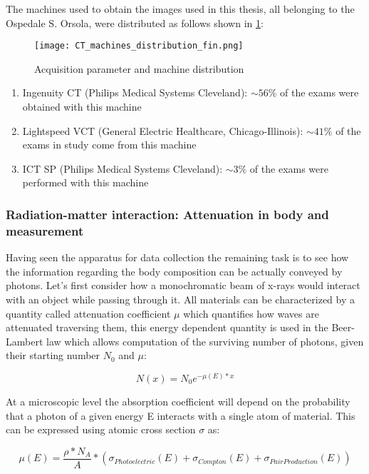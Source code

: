 The machines used to obtain the images used in this thesis, all belonging to the Ospedale S. Orsola, were distributed as follows shown in \ref{fig:ct_dist}:


\begin{figure}[H]
\centering
  		\texttt{[image: CT\_machines\_distribution\_fin.png]}
        \caption{Acquisition parameter and machine distribution\label{fig:ct_dist}}
\end{figure}

\begin{enumerate}
\item Ingenuity CT  (Philips Medical Systems Cleveland):  $\sim 56\%$ of the exams were obtained with this machine 
\item Lightspeed VCT  (General Electric Healthcare, Chicago-Illinois): $\sim 41\%$ of the exams in study come from this machine
\item ICT SP (Philips Medical Systems Cleveland):  $\sim 3\%$ of the exams were performed with this machine
\end{enumerate}

\subsubsection{Radiation-matter interaction: Attenuation in body and measurement}
Having seen the apparatus for data collection the remaining task is to see how the information regarding the body composition can be actually conveyed by photons.
Let's first consider how a monochromatic beam of x-rays would interact with an object while passing through it. All materials can be characterized by a quantity called attenuation coefficient $\mu$ which quantifies how waves are attenuated traversing them, this energy dependent quantity is used in the Beer-Lambert law which allows computation of the surviving number of photons, given their starting number $N_0$ and $\mu$:

\begin{equation}
N(x) = N_0e^{-\mu(E)*x}
\label{Beer-Lambert}
\end{equation}

At a microscopic level the absorption coefficient will depend on the probability that a photon of a given energy E interacts with a single atom of material. This can be expressed using atomic cross section $\sigma$ as:

\begin{equation}\label{Lin_att_coef_def}
\mu(E) = \frac{\rho*N_A}{A}*(\sigma_{Photoelectric}(E)+\sigma_{Compton}(E)+\sigma_{PairProduction}(E))
\end{equation}

